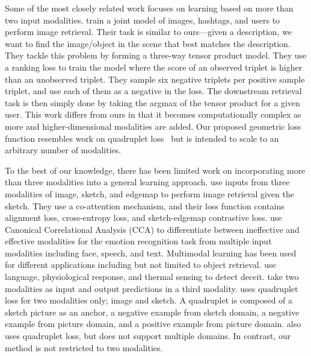 \documentclass[10pt]{article} %
\begin{document}
Some of the most closely related work focuses on learning based on more than two input modalities. \citet{Veit_2018_CVPR} train a joint model of images, hashtags, and users to perform image retrieval. Their task is similar to ours---given a description, we want to find the image/object in the scene that best matches the description. They tackle this problem by forming a three-way tensor product model. They use a ranking loss to train the model where the score of an observed triplet is higher than an unobserved triplet. They sample six negative triplets per positive sample triplet, and use each of them as a negative in the loss. The downstream retrieval task is then simply done by taking the argmax of the tensor product for a given user. This work differs from ours in that it becomes computationally complex as more and higher-dimensional modalities are added.
Our proposed geometric loss function resembles work on quadruplet loss~\citep{chen2017beyond,tursun2021efficient} but is intended to scale to an arbitrary number of modalities.

To the best of our knowledge, there has been limited work on incorporating more than three modalities into a general learning approach. \citet{semihet_three_way_Lei_2020} use inputs from three modalities of image, sketch, and edgemap to perform image retrieval given the sketch. They use a co-attention mechanism, and their loss function contains alignment loss, cross-entropy loss, and sketch-edgemap contrastive loss. \citet{Mittal2020M3ER} use Canonical Correlational Analysis (CCA) to differentiate between ineffective and effective modalities for the emotion recognition task from multiple input modalities including face, speech, and text. Multimodal learning has been used for different applications including but not limited to object retrieval. \citet{Deception_ICMI_2014} use language, physiological response, and thermal sensing to detect deceit. \citet{het_data_fusion_liu_IEEE_2017} take two modalities as input and output predictions in a third modality. \citet{tursun2021efficient} uses quadruplet loss for two modalities only; image and sketch. A quadruplet is composed of a sketch picture as an anchor, a negative example from sketch domain, a negative example from picture domain, and a positive example from picture domain. \citet{chen2017beyond} also uses quadruplet loss, but does not support multiple domains. In contrast, our method is not restricted to two modalities.
 
\end{document}
